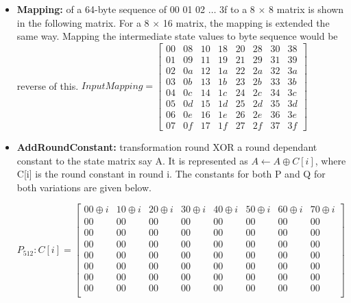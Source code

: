   \begin{itemize}
    \item {\bf Mapping:} of a 64-byte sequence of 00 01 02 $\ldots$ 3f to a 8 $\times$ 8 matrix is shown in the following matrix.
    For a 8 $\times$ 16 matrix, the mapping is extended the same way. Mapping the intermediate state values to byte sequence
    would be reverse of this.
      $ Input Mapping = \begin{bmatrix}
        00 & 08 & 10 & 18 & 20 & 28 & 30 & 38 \\
        01 & 09 & 11 & 19 & 21 & 29 & 31 & 39 \\
        02 & 0a & 12 & 1a & 22 & 2a & 32 & 3a \\
        03 & 0b & 13 & 1b & 23 & 2b & 33 & 3b \\
        04 & 0c & 14 & 1c & 24 & 2c & 34 & 3c \\
        05 & 0d & 15 & 1d & 25 & 2d & 35 & 3d \\
        06 & 0e & 16 & 1e & 26 & 2e & 36 & 3e \\
        07 & 0f & 17 & 1f & 27 & 2f & 37 & 3f
      \end{bmatrix}$
    \item {\bf AddRoundConstant:} transformation round XOR a round dependant constant to the state matrix say A. It is
    represented as $A \gets A \oplus C[i]$, where C[i] is the round constant in round i. The constants for both P and Q for both
    variations are given below.

    $ P_{512}: C[i] = \begin{bmatrix}
      00 \oplus i & 10 \oplus i & 20 \oplus i & 30 \oplus i & 40 \oplus i & 50 \oplus i & 60 \oplus i & 70 \oplus i \\
      00     & 00     & 00     & 00     & 00     & 00     & 00     & 00     \\
      00     & 00     & 00     & 00     & 00     & 00     & 00     & 00     \\
      00     & 00     & 00     & 00     & 00     & 00     & 00     & 00     \\
      00     & 00     & 00     & 00     & 00     & 00     & 00     & 00     \\
      00     & 00     & 00     & 00     & 00     & 00     & 00     & 00     \\
      00     & 00     & 00     & 00     & 00     & 00     & 00     & 00     \\
      00     & 00     & 00     & 00     & 00     & 00     & 00     & 00     \\
    \end{bmatrix}$


\end{itemize}
